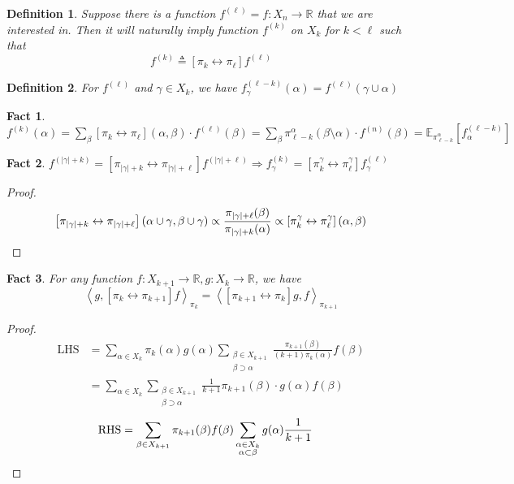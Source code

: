 \documentclass{article}
\newtheorem{define}{Definition}[section]
\newtheorem{fact}{Fact}[section]
\def\Op#1#2{\left[#1 \leftrightarrow #2\right]}
\def\<{\left\langle}
\def\>{\right\rangle}
\begin{document}
\begin{define}
  Suppose there is a function $f^{(\ell)} = f : X_n \to \mathbb{R}$ that we are interested in. Then it will naturally imply function $f^{(k)}$ on $X_k$ for $k < \ell$ such that
  \[f^{(k)} \triangleq \Op{\pi_k}{\pi_\ell}f^{(\ell)}\]
\end{define}

\begin{define}
  For $f^{(\ell)}$ and $\gamma\in X_k$, we have $f^{(\ell-k)}_\gamma(\alpha) = f^{(\ell)}(\gamma\cup\alpha)$
\end{define}

\begin{fact}
  $f^{(k)}(\alpha) = \sum_{\beta} \Op{\pi_k}{\pi_\ell}(\alpha, \beta) \cdot f^{(\ell)}(\beta) = \sum_\beta \pi^\alpha_{\ell-k}(\beta\setminus\alpha) \cdot f^{(n)}(\beta) = \mathbb{E}_{\pi^\alpha_{\ell-k}}[f_\alpha^{(\ell-k)}]$
\end{fact}

\begin{fact}\label{fact:f-consistent}
  $f^{(|\gamma|+k)} = \Op{\pi_{|\gamma|+k}}{\pi_{|\gamma|+\ell}} f^{(|\gamma| + \ell)} \Rightarrow f^{(k)}_\gamma = \Op{\pi^\gamma_k}{\pi^\gamma_\ell} f^{(\ell)}_\gamma$
\end{fact}
\begin{proof}
  \[\Op{\pi_{|\gamma| + k}}{\pi_{|\gamma| + \ell}}(\alpha\cup\gamma, \beta\cup\gamma) \propto \frac{\pi_{|\gamma|+\ell}(\beta)}{\pi_{|\gamma|+k}(\alpha)} \propto \Op{\pi_k^\gamma}{\pi_\ell^\gamma}(\alpha, \beta)\qedhere\]
\end{proof}

\begin{fact}
  For any function $f: X_{k+1}\to\mathbb{R}, g: X_k \to \mathbb{R}$, we have
  \[\<g, \Op{\pi_k}{\pi_{k+1}} f\>_{\pi_k} = \<\Op{\pi_{k+1}}{\pi_k} g, f\>_{\pi_{k+1}}\]
\end{fact}
\begin{proof}
  \begin{align*}
    \mathrm{LHS} &= \sum_{\alpha\in X_k} \pi_k(\alpha) g(\alpha) \sum_{\substack{\beta\in X_{k+1} \\ \beta \supset \alpha}} \frac{\pi_{k+1}(\beta)}{(k+1)\pi_k(\alpha)} f(\beta) \\
    &= \sum_{\alpha\in X_k}\sum_{\substack{\beta\in X_{k+1}\\\beta\supset\alpha}} \frac{1}{k+1} \pi_{k+1}(\beta) \cdot g(\alpha) f(\beta)
  \end{align*}
  \begin{align*}
    \mathrm{RHS} &= \sum_{\beta\in X_{k+1}} \pi_{k+1}(\beta) f(\beta) \sum_{\substack{\alpha \in X_k \\ \alpha \subset \beta}} g(\alpha) \frac{1}{k+1} \qedhere
  \end{align*}
\end{proof}
\end{document}
